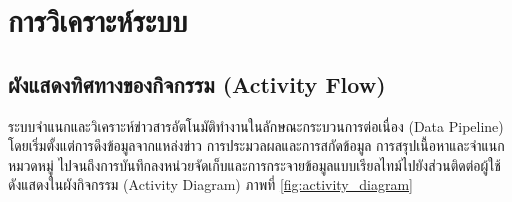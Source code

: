 
\section{การวิเคราะห์ระบบ}

\subsection{ผังแสดงทิศทางของกิจกรรม (Activity Flow)}

ระบบจำแนกและวิเคราะห์ข่าวสารอัตโนมัติทำงานในลักษณะกระบวนการต่อเนื่อง (Data Pipeline) โดยเริ่มตั้งแต่การดึงข้อมูลจากแหล่งข่าว การประมวลผลและการสกัดข้อมูล การสรุปเนื้อหาและจำแนกหมวดหมู่ ไปจนถึงการบันทึกลงหน่วยจัดเก็บและการกระจายข้อมูลแบบเรียลไทม์ไปยังส่วนติดต่อผู้ใช้ ดังแสดงในผังกิจกรรม (Activity Diagram) ภาพที่ \ref{fig:activity_diagram}

